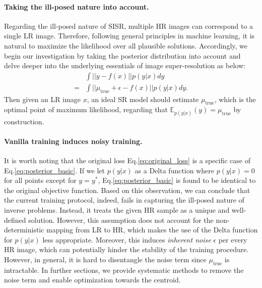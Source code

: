 \documentclass[letterpaper]{article} %
\begin{document}
\paragraph{Taking the ill-posed nature into account.}
%
Regarding the ill-posed nature of SISR, multiple HR images can correspond to a single LR image. Therefore, following general principles in machine learning, it is natural to maximize the likelihood over all plausible solutions.
%
Accordingly, we begin our investigation by taking the posterior distribution into account and delve deeper into the underlying essentials of image super-resolution as below:
\begin{equation}
    \label{eq:posterior_basic}
    \begin{aligned}
          & \int ||y-f(x)||p(y|x)dy \\
        = & \int ||\mu_{\text{true}} + \epsilon - f(x) ||p(y|x)dy
        .
    \end{aligned}
\end{equation}
Then given an LR image $x$, an ideal SR model should estimate $\mu_{\text{true}}$, which is the optimal point of maximum likelihood, regarding that $\mathbb{E}_{p(y|x)}(y)=\mu_{\text{true}}$ by construction. 


\paragraph{Vanilla training induces noisy training.}
It is worth noting that the original loss Eq.\eqref{eq:original_loss} is a specific case of Eq.\eqref{eq:posterior_basic}. If we let $p(y|x)$ as a Delta function where $p(y|x)=0$ for all points except for $y=y^*$, Eq.\eqref{eq:posterior_basic} is found to be identical to the original objective function.
%
Based on this observation, we can conclude that the current training protocol, indeed, fails in capturing the ill-posed nature of inverse problems. Instead, it treats the given HR sample as a unique and well-defined solution.  
%
However, this assumption does not account for the non-deterministic mapping from LR to HR, which makes the use of the Delta function for $p(y|x)$ less appropriate.
%
Moreover, this induces \textit{inherent noise} $\epsilon$ per every HR image, which can potentially hinder the stability of the training procedure.
%
However, in general, it is hard to disentangle the noise term since $\mu_{\text{true}}$ is intractable.
%
In further sections, we provide systematic methods to remove the noise term and enable optimization towards the centroid.
\end{document}
